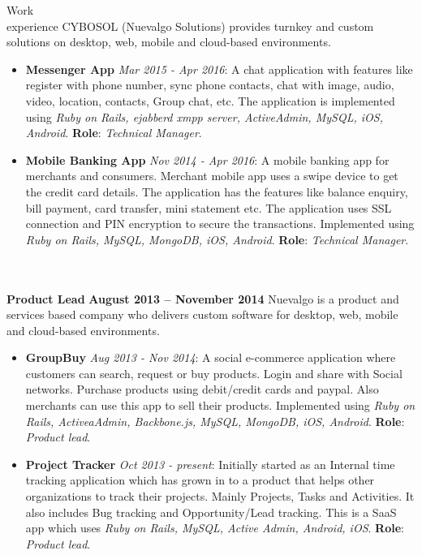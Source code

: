 \documentclass{resume}
\begin{document}
\begin{category}{Work \\experience}
  \citemnobullet CYBOSOL (Nuevalgo Solutions) provides turnkey and custom solutions on desktop, web, mobile and cloud-based environments.
  \begin{itemize}
  \item \textbf{Messenger App} {\em Mar 2015 - Apr 2016}: A chat
    application with features like register with phone number, sync
    phone contacts, chat with image, audio, video, location, contacts,
    Group chat, etc. The application is implemented using {\em Ruby on
      Rails, ejabberd xmpp server, ActiveAdmin, MySQL, iOS,
      Android}. \textbf{Role}: {\em Technical Manager}.
  \item \textbf{Mobile Banking App} {\em Nov 2014 - Apr 2016}: A mobile
    banking app for merchants and consumers. Merchant mobile app uses
    a swipe device to get the credit card details. The application has
    the features like balance enquiry, bill payment, card transfer,
    mini statement etc. The application uses SSL connection and PIN
    encryption to secure the transactions. Implemented using {\em Ruby
      on Rails, MySQL, MongoDB, iOS, Android}. \textbf{Role}: {\em
      Technical Manager}.\\\\\\
  \end{itemize}
  \citemnobullet \textbf{Product Lead} \hfill \textbf{August 2013 -- November 2014}
  \citemnobullet Nuevalgo is a product and services based company who delivers custom software for desktop, web, mobile and cloud-based environments.
  \begin{itemize}
  \item \textbf{GroupBuy} {\em Aug 2013 - Nov 2014}: A social
    e-commerce application where customers can search, request or buy
    products. Login and share with Social networks. Purchase products
    using debit/credit cards and paypal. Also merchants can use this
    app to sell their products. Implemented using {\em Ruby on Rails,
      ActiveaAdmin, Backbone.js, MySQL, MongoDB, iOS, Android}. \textbf{Role}: {\em Product lead}.
  \item \textbf{Project Tracker} {\em Oct 2013 - present}: Initially
    started as an Internal time tracking application which has grown
    in to a product that helps other    organizations to track their
    projects. Mainly Projects, Tasks and Activities. It also includes
    Bug tracking and Opportunity/Lead tracking. This is a SaaS app
    which uses {\em Ruby on Rails, MySQL, Active Admin, Android, iOS}. \textbf{Role}: {\em Product lead}.

\end{itemize}
\end{category}
\end{document}
